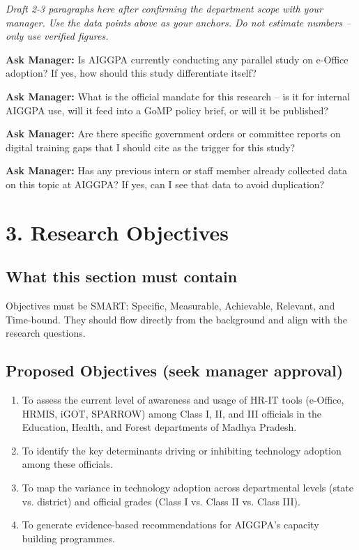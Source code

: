 \documentclass[12pt,a4paper]{article}
\newcommand{\managerQ}[1]{%
  \begin{tcolorbox}[colback=govgold!10,colframe=govgold,boxrule=0.5pt,arc=2mm,
    left=4pt,right=4pt,top=2pt,bottom=2pt]
    \small\textbf{Ask Manager:} #1
  \end{tcolorbox}
}
\newcommand{\fill}[1]{%
  \begin{tcolorbox}[colback=govgray,colframe=govblue!30,boxrule=0.4pt,arc=2mm,
    left=4pt,right=4pt,top=2pt,bottom=2pt]
    \small\textit{#1}
  \end{tcolorbox}
}
\begin{document}
\fill{Draft 2-3 paragraphs here after confirming the department scope with your manager. Use the data points above as your anchors. Do not estimate numbers -- only use verified figures.}

\managerQ{Is AIGGPA currently conducting any parallel study on e-Office adoption? If yes, how should this study differentiate itself?}

\managerQ{What is the official mandate for this research -- is it for internal AIGGPA use, will it feed into a GoMP policy brief, or will it be published?}

\managerQ{Are there specific government orders or committee reports on digital training gaps that I should cite as the trigger for this study?}

\managerQ{Has any previous intern or staff member already collected data on this topic at AIGGPA? If yes, can I see that data to avoid duplication?}

\vspace{0.4cm}

\section{3. Research Objectives}

\subsection{What this section must contain}
Objectives must be SMART: Specific, Measurable, Achievable, Relevant, and Time-bound. They should flow directly from the background and align with the research questions.

\subsection{Proposed Objectives (seek manager approval)}

\begin{tcolorbox}[colback=govblue!5,colframe=govblue!40,arc=2mm]
\small
\begin{enumerate}[leftmargin=1.5em,label=\textbf{RO-\arabic*.}]
  \item To assess the current level of awareness and usage of HR-IT tools (e-Office, HRMIS, iGOT, SPARROW) among Class I, II, and III officials in the Education, Health, and Forest departments of Madhya Pradesh.
  \item To identify the key determinants driving or inhibiting technology adoption among these officials.
  \item To map the variance in technology adoption across departmental levels (state vs. district) and official grades (Class I vs. Class II vs. Class III).
  \item To generate evidence-based recommendations for AIGGPA's capacity building programmes.
\end{enumerate}
\end{tcolorbox}
\end{document}

